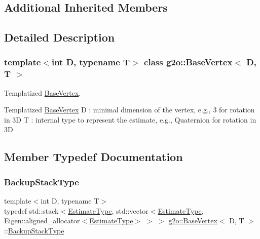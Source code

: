 \subsection*{Additional Inherited Members}


\subsection{Detailed Description}
\subsubsection*{template$<$int D, typename T$>$\newline
class g2o\+::\+Base\+Vertex$<$ D, T $>$}

Templatized \mbox{\hyperlink{classg2o_1_1_base_vertex}{Base\+Vertex}}. 

Templatized \mbox{\hyperlink{classg2o_1_1_base_vertex}{Base\+Vertex}} D \+: minimal dimension of the vertex, e.\+g., 3 for rotation in 3D T \+: internal type to represent the estimate, e.\+g., Quaternion for rotation in 3D 

\subsection{Member Typedef Documentation}
\mbox{\label{classg2o_1_1_base_vertex_ae6632291d46b458196bdb021a6c8cba1}} 
\subsubsection{\texorpdfstring{Backup\+Stack\+Type}{BackupStackType}}
{\footnotesize\ttfamily template$<$int D, typename T$>$ \\
typedef std\+::stack$<$\mbox{\hyperlink{classg2o_1_1_base_vertex_aaffb179a0d591da4769ec7c3fc7f7daa}{Estimate\+Type}}, std\+::vector$<$\mbox{\hyperlink{classg2o_1_1_base_vertex_aaffb179a0d591da4769ec7c3fc7f7daa}{Estimate\+Type}}, Eigen\+::aligned\+\_\+allocator$<$\mbox{\hyperlink{classg2o_1_1_base_vertex_aaffb179a0d591da4769ec7c3fc7f7daa}{Estimate\+Type}}$>$ $>$ $>$ \mbox{\hyperlink{classg2o_1_1_base_vertex}{g2o\+::\+Base\+Vertex}}$<$ D, T $>$\+::\mbox{\hyperlink{classg2o_1_1_base_vertex_ae6632291d46b458196bdb021a6c8cba1}{Backup\+Stack\+Type}}}

